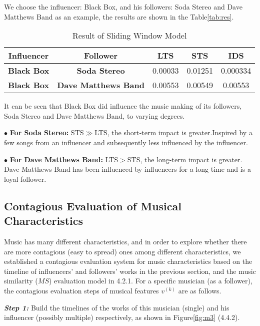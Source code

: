 \documentclass[12pt]{article}  %
\begin{document}
We choose the influencer: Black Box, and his followers: Soda Stereo and Dave Matthews Band as an example, the results are shown in the Table\eqref{tab:res}.
\vspace{-0.4cm}
\begin{table}[htbp]
	\centering
	\caption{Result of Sliding Window Model}
	\begin{tabular}{c|c|c|c|c}
		\hline
		\hline
		\textbf{Influencer}  & \textbf{Follower}    & \textbf{LTS}         & \textbf{STS}         & \textbf{IDS}          \\
		\hline
		\hline
		\textbf{Black Box}   & \textbf{Soda Stereo} & 0.00033              & 0.01251              & 0.000334              \\
		\hline
		\textbf{Black Box}   & \textbf{Dave Matthews Band} & 0.00553              & 0.00549              & 0.00553               \\
		\hline
		\hline
	\end{tabular}%
	\label{tab:res}%
\end{table}%

It can be seen that Black Box did influence the music making of its followers, Soda Stereo and Dave Matthews Band, to varying degrees.

$\bullet$ \textbf{For Soda Stereo: }STS$\gg$LTS, the short-term impact is greater.Inspired by a few songs from an influencer and subsequently less influenced by the influencer.

$\bullet$ \textbf{For Dave Matthews Band: }LTS$>$STS, the long-term impact is greater. Dave Matthews Band has been influenced by influencers for a long time and is a loyal follower.

\subsection{Contagious Evaluation of Musical Characteristics}

Music has many different characteristics, and in order to explore whether there are more contagious (easy to spread) ones among different characteristics, we established a contagious evaluation system for music characteristics based on the timeline of influencers' and followers' works in the previous section, and the music similarity ($MS$) evaluation model in 4.2.1. For a specific musician (as a follower), the contagious evaluation steps of musical features $v^{(k)}$ are as follows.

\textbf{\emph{Step 1:}} Build the timelines of the works of this musician (single) and his influencer (possibly multiple) respectively, as shown in Figure\eqref{fig:m3} (4.4.2).
\end{document}
